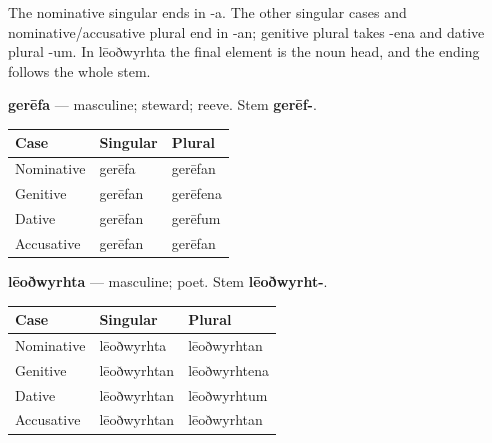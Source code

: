 The nominative singular ends in -a. The other singular cases and nominative/\allowbreak{}accusative plural end in -an; genitive plural takes -ena and dative plural -um. In lēoðwyrhta the final element is the noun head, and the ending follows the whole stem.

\textbf{gerēfa} — masculine; steward; reeve. Stem \textbf{gerēf-}.

\par\begingroup
\fontsize{10.5}{13.2}\selectfont
\setlength{\LTleft}{0pt}\setlength{\LTright}{\fill}
\noindent
\begin{tabular}{@{}>{\raggedright\arraybackslash}p{39.46mm}>{\raggedright\arraybackslash}p{39.46mm}>{\raggedright\arraybackslash}p{39.46mm}@{}}
\toprule
\textbf{Case} & \textbf{Singular} & \textbf{Plural} \\
\midrule
Nominative & gerēfa & gerēfan \\
Genitive & gerēfan & gerēfena \\
Dative & gerēfan & gerēfum \\
Accusative & gerēfan & gerēfan \\
\bottomrule
\end{tabular}
\par\endgroup

\textbf{lēoðwyrhta} — masculine; poet. Stem \textbf{lēoðwyrht-}.

\par\begingroup
\fontsize{10.5}{13.2}\selectfont
\setlength{\LTleft}{0pt}\setlength{\LTright}{\fill}
\noindent
\begin{tabular}{@{}>{\raggedright\arraybackslash}p{35.87mm}>{\raggedright\arraybackslash}p{39.46mm}>{\raggedright\arraybackslash}p{43.05mm}@{}}
\toprule
\textbf{Case} & \textbf{Singular} & \textbf{Plural} \\
\midrule
Nominative & lēoðwyrhta & lēoðwyrhtan \\
Genitive & lēoðwyrhtan & lēoðwyrhtena \\
Dative & lēoðwyrhtan & lēoðwyrhtum \\
Accusative & lēoðwyrhtan & lēoðwyrhtan \\
\bottomrule
\end{tabular}
\par\endgroup

